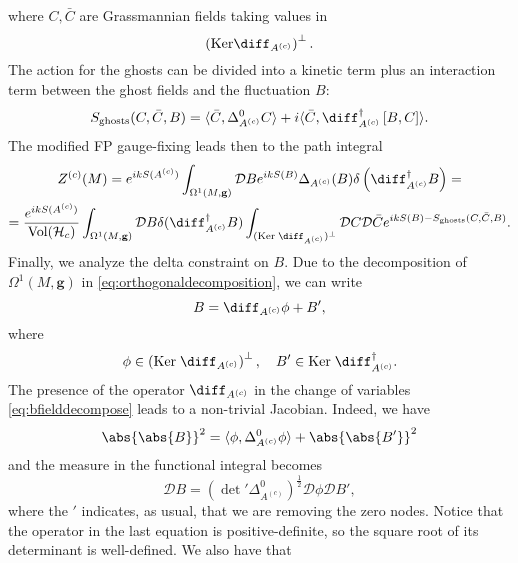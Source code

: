 where $C,\bar{C}$ are Grassmannian fields taking values in
\begin{equation}
  \left(\mathrm{Ker}\diff_{A^{(c)}}\right)^\bot .
\end{equation}
The action for the ghosts can be divided into a kinetic term plus an
interaction term between the ghost fields and the fluctuation $B$:
\begin{equation}
  S_{\mathrm{ghosts}}(C,\bar{C},B) = \langle\bar{C},\Delta^0_{A^{(c)}}C\rangle
  + i\langle\bar{C},\diff^\dagger_{A^{(c)}}\left[B,C\right]\rangle .
\end{equation}
The modified FP gauge-fixing leads then to the path integral
\begin{multline}
  Z^{(c)}(M) = e^{ikS(A^{(c)})}\int_{\Omega^1(M,\mathbf{g})}\mathcal{D}B
  e^{ikS(B)}\Delta_{A^{(c)}}(B)\delta\left(\diff^\dagger_{A^{(c)}}B\right)=\\
  = \frac{e^{ikS(A^{(c)})}}{\mathrm{Vol}(\mathcal{H}_c)}\int_{\Omega^1(M,\mathbf{g})}\mathcal{D}B\delta(\diff^\dagger_{A^{(c)}}B)\int_{(\mathrm{Ker}\;\diff_{A^{(c)}})^\bot}\mathcal{D}C\mathcal{D}\bar{C}e^{ikS(B)-S_{\mathrm{ghosts}}(C,\bar{C},B)}.
\end{multline}
Finally, we analyze the delta constraint on $B$. Due to the decomposition of
$\Omega^1(M,\mathbf{g})$ in \eqref{eq:orthogonaldecomposition}, we can write
\begin{equation}
  B = \diff_{A^{(c)}}\phi + B',
  \label{eq:bfielddecompose}
\end{equation}
where
\begin{equation}
  \phi\in\left(\mathrm{Ker}\;\diff_{A^{(c)}}\right)^\bot, \quad
  B'\in\mathrm{Ker}\;\diff^\dagger_{A^{(c)}}.
\end{equation}
The presence of the operator $\diff_{A^{(c)}}$ in the change of variables
\eqref{eq:bfielddecompose} leads to a non-trivial Jacobian. Indeed,
we have
\begin{equation}
  \abs{\abs{B}}^2 = \langle\phi,\Delta^0_{A^{(c)}}\phi\rangle
  + \abs{\abs{B'}}^2
\end{equation}
and the measure in the functional integral becomes
\begin{equation}
  \mathcal{D}B
  = \left({\det} ' \Delta^0_{A^{(c)}}\right)^{\frac{1}{2}}\mathcal{D}\phi\mathcal{D}B',
  \label{eq:chernsimonsjacobian}
\end{equation}
where the $'$ indicates, as usual, that we are removing the  zero nodes. Notice
that the operator in the last equation is positive-definite, so the square root
of its determinant is well-defined. We also have that
